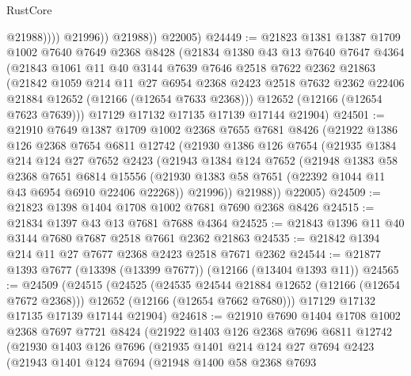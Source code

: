 \begin{lexlean}{RustCore}
\begin{coremodule}
                      @21988))))
              @21996))
          @21988))
      @22005)
@24449 := @21823
    @1381
    @1387
    @1709
    @1002
    @7640
    @7649
    @2368
    @8428
    (@21834
      @1380
      @43
      @13
      @7640
      @7647
      @4364
      (@21843
        @1061
        @11
        @40
        @3144
        @7639
        @7646
        @2518
        @7622
        @2362
        @21863
        (@21842
          @1059
          @214
          @11
          @27
          @6954
          @2368
          @2423
          @2518
          @7632
          @2362
          @22406
          @21884
          @12652
          (@12166 (@12654 @7633 @2368)))
        @12652
        (@12166 (@12654 @7623 @7639)))
      @17129
      @17132
      @17135
      @17139
      @17144
      @21904)
@24501 := @21910
    @7649
    @1387
    @1709
    @1002
    @2368
    @7655
    @7681
    @8426
    (@21922
      @1386
      @126
      @2368
      @7654
      @6811
      @12742
      (@21930
        @1386
        @126
        @7654
        (@21935
          @1384
          @214
          @124
          @27
          @7652
          @2423
          (@21943
            @1384
            @124
            @7652
            (@21948
              @1383
              @58
              @2368
              @7651
              @6814
              @15556
              (@21930 @1383 @58 @7651 (@22392 @1044 @11 @43 @6954 @6910 @22406 @22268))
              @21996))
          @21988))
      @22005)
@24509 := @21823 @1398 @1404 @1708 @1002 @7681 @7690 @2368 @8426
@24515 := @21834 @1397 @43 @13 @7681 @7688 @4364
@24525 := @21843 @1396 @11 @40 @3144 @7680 @7687 @2518 @7661 @2362 @21863
@24535 := @21842 @1394 @214 @11 @27 @7677 @2368 @2423 @2518 @7671 @2362
@24544 := @21877 @1393 @7677 (@13398 (@13399 @7677)) (@12166 (@13404 @1393 @11))
@24565 := @24509
    (@24515
      (@24525
        (@24535 @24544 @21884 @12652 (@12166 (@12654 @7672 @2368)))
        @12652
        (@12166 (@12654 @7662 @7680)))
      @17129
      @17132
      @17135
      @17139
      @17144
      @21904)
@24618 := @21910
    @7690
    @1404
    @1708
    @1002
    @2368
    @7697
    @7721
    @8424
    (@21922
      @1403
      @126
      @2368
      @7696
      @6811
      @12742
      (@21930
        @1403
        @126
        @7696
        (@21935
          @1401
          @214
          @124
          @27
          @7694
          @2423
          (@21943
            @1401
            @124
            @7694
            (@21948
              @1400
              @58
              @2368
              @7693

\end{coremodule}
\end{lexlean}
